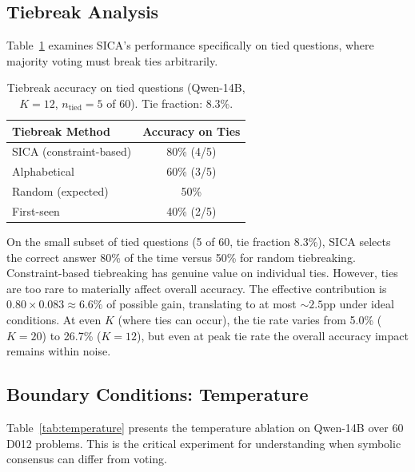 \documentclass[11pt]{article}
\begin{document}
\subsection{Tiebreak Analysis}
\label{sec:tiebreak}

Table~\ref{tab:tiebreak} examines SICA's performance specifically on tied questions, where majority voting must break ties arbitrarily.

\begin{table}[t]
\centering
\caption{Tiebreak accuracy on tied questions (Qwen-14B, $K{=}12$, $n_{\text{tied}}{=}5$ of 60). Tie fraction: 8.3\%.}
\label{tab:tiebreak}
\small
\begin{tabular}{@{}lc@{}}
\toprule
Tiebreak Method & Accuracy on Ties \\
\midrule
SICA (constraint-based) & 80\% (4/5) \\
Alphabetical & 60\% (3/5) \\
Random (expected) & 50\% \\
First-seen & 40\% (2/5) \\
\bottomrule
\end{tabular}
\end{table}

On the small subset of tied questions (5 of 60, tie fraction 8.3\%), SICA selects the correct answer 80\% of the time versus 50\% for random tiebreaking.
Constraint-based tiebreaking has genuine value on individual ties.
However, ties are too rare to materially affect overall accuracy.
The effective contribution is $0.80 \times 0.083 \approx 6.6\%$ of possible gain, translating to at most ${\sim}2.5$pp under ideal conditions.
At even $K$ (where ties can occur), the tie rate varies from 5.0\% ($K{=}20$) to 26.7\% ($K{=}12$), but even at peak tie rate the overall accuracy impact remains within noise.

\subsection{Boundary Conditions: Temperature}
\label{sec:temperature}

Table~\ref{tab:temperature} presents the temperature ablation on Qwen-14B over 60 D012 problems.
This is the critical experiment for understanding when symbolic consensus can differ from voting.
\end{document}
